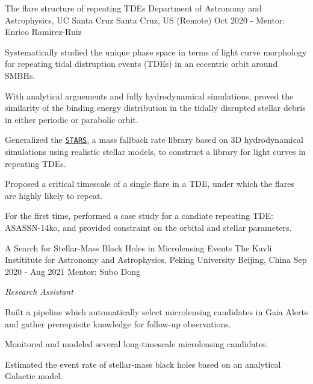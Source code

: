 \begin{cvexperiences}
\cvexperience
{The flare structure of repeating TDEs} %
{Department of Astronomy and Astrophysics, UC Santa Cruz} %
{Santa Cruz, US (Remote)} %
{Oct 2020 - } %
{Mentor: Enrico Ramirez-Ruiz}
{ %
	\begin{cvitems}
		\item {Systematically studied the unique phase space in terms of light curve morphology for repeating tidal distruption events (TDEs) in an eccentric orbit around SMBHs.}
		\item {With analytical arguements and fully hydrodynamical simulations, proved the similarity of the binding energy distribution in the tidally disrupted stellar debris in either periodic or parabolic orbit.}
		\item {Generalized the \href{https://github.com/jamielaw-smith/STARS_library}{\texttt{STARS}}, a mass fallback rate library based on 3D hydrodynamical simulations using realistic stellar models, to construct a library for light curves in repeating TDEs.}
		\item {Proposed a critical timescale of a single flare in a TDE, under which the flares are highly likely to repeat.}
		\item {For the first time, performed a case study for a candiate repeating TDE: ASASSN-14ko, and provided constraint on the orbital and stellar parameters.}
	\end{cvitems}
}

\cvexperience
{A Search for Stellar-Mass Black Holes in Microlensing Events} %
{The Kavli Instititute for Astronomy and Astrophysics, Peking University} %
{Beijing, China} %
{Sep 2020 - Aug 2021} %
{Mentor: Subo Dong}
{ %
	\begin{cvitems}
		\item {\textit{Research Assistant}}
		\item {Built a pipeline which automatically select microlensing candidates in Gaia Alerts and gather prerequisite knowledge for follow-up observations.}
		\item {Monitored and modeled several long-timescale microlensing candidates.}
		\item {Estimated the event rate of stellar-mass black holes based on an analytical Galactic model.}
	\end{cvitems}
}

\end{cvexperiences}